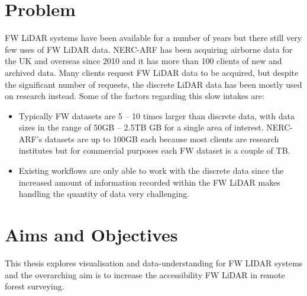 \documentclass{subfiles}
\begin{document}
\section{Problem}
\par FW LiDAR systems have been available for a number of years but there still very few uses of FW LiDAR data. NERC-ARF has been acquiring airborne data for the UK and overseas since 2010 and it has more than 100 clients of new and archived data. Many clients request FW LiDAR data to be acquired, but despite the significant number of requests, the discrete LiDAR data has been mostly used on research instead. Some of the factors regarding this slow intakes are:
\begin{itemize}
	\item Typically FW datasets are 5 – 10 times larger than discrete data, with data sizes in the range of 50GB – 2.5TB GB for a single area of interest. NERC-ARF's datasets are up to 100GB each because most clients are research institutes but for commercial purposes each FW dataset is a couple of TB.
	\item Existing workflows are only able to work with the discrete data since the increased amount of information recorded within the FW LiDAR makes handling the quantity of data very challenging.
\end{itemize}

\section {Aims and Objectives}

\par This thesis explores visualisation and data-understanding for FW LIDAR systems and the overarching aim is to increase the accessibility FW LiDAR in remote forest surveying.
\end{document}

